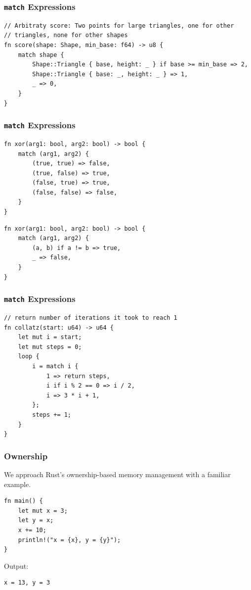 \begin{frame}[fragile]
    \frametitle{\texttt{match} Expressions}

    \begin{verbatim}
// Arbitraty score: Two points for large triangles, one for other
// triangles, none for other shapes
fn score(shape: Shape, min_base: f64) -> u8 {
    match shape {
        Shape::Triangle { base, height: _ } if base >= min_base => 2,
        Shape::Triangle { base: _, height: _ } => 1,
        _ => 0,
    }
}
    \end{verbatim}
\end{frame}

\begin{frame}[fragile]
    \frametitle{\texttt{match} Expressions}

    \begin{verbatim}
fn xor(arg1: bool, arg2: bool) -> bool {
    match (arg1, arg2) {
        (true, true) => false,
        (true, false) => true,
        (false, true) => true,
        (false, false) => false,
    }
}
    \end{verbatim}
    \pause
    \vfill
    \begin{verbatim}
fn xor(arg1: bool, arg2: bool) -> bool {
    match (arg1, arg2) {
        (a, b) if a != b => true,
        _ => false,
    }
}
    \end{verbatim}
\end{frame}

\begin{frame}[fragile]
    \frametitle{\texttt{match} Expressions}

    \begin{verbatim}
// return number of iterations it took to reach 1
fn collatz(start: u64) -> u64 {
    let mut i = start;
    let mut steps = 0;
    loop {
        i = match i {
            1 => return steps,
            i if i % 2 == 0 => i / 2,
            i => 3 * i + 1,
        };
        steps += 1;
    }
}
    \end{verbatim}
\end{frame}

\begin{frame}[fragile]
    \frametitle{Ownership}
    We approach Rust's ownership-based memory management with a familiar example.
    \vfill
    \begin{verbatim}
fn main() {
    let mut x = 3;
    let y = x;
    x += 10;
    println!("x = {x}, y = {y}");
}
    \end{verbatim}
    \pause
    \vfill
    Output:
    \pause
    \begin{verbatim}
x = 13, y = 3
    \end{verbatim}
\end{frame}

